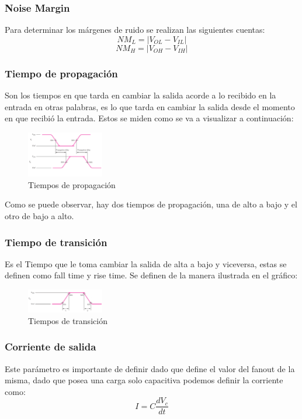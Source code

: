 \subsubsection{Noise Margin}
Para determinar los márgenes de ruido se realizan las siguientes cuentas:
$$NM_{L}=|V_{OL}-V_{IL}|$$
$$NM_{H}=|V_{OH}-V_{IH}|$$

\subsubsection{Tiempo de propagación}
Son los tiempos en que tarda en cambiar la salida acorde a lo recibido en la entrada en otras palabras, es lo que tarda en cambiar la salida desde el momento en que recibió la entrada. Estos se miden como se va a visualizar a continuación:
\begin{figure}[H]
	\centering
	\includegraphics[width=0.3\textwidth]{Ejercicio1/Propagacion.png}
	\caption{Tiempos de propagación}
\end{figure}
Como se puede observar, hay dos tiempos de propagación, una de alto a bajo y el otro de bajo a alto.

\subsubsection{Tiempo de transición}
Es el Tiempo que le toma cambiar la salida de alta a bajo y viceversa, estas se definen como fall time y rise time. Se definen de la manera ilustrada en el gráfico:
\begin{figure}[H]
	\centering
	\includegraphics[width=0.3\textwidth]{Ejercicio1/Transicion.png}
	\caption{Tiempos de transición}
\end{figure}

\subsubsection{Corriente de salida}
Este parámetro es importante de definir dado que define el valor del fanout de la misma, dado que posea una carga solo capacitiva podemos definir la corriente como:
$$I=C\frac{dV_c}{dt}$$ 

